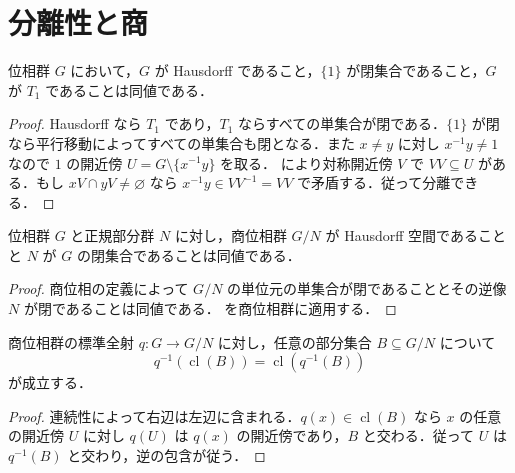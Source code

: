 \section{分離性と商}
\begin{prop}[位相群のHausdorff性の判定]
位相群 $G$ において，$G$ が Hausdorff であること，$\{1\}$ が閉集合であること，$G$ が $T_1$ であることは同値である．
\end{prop}
\begin{proof}
Hausdorff なら $T_1$ であり，$T_1$ ならすべての単集合が閉である．$\{1\}$ が閉なら平行移動によってすべての単集合も閉となる．また $x\ne y$ に対し $x^{-1}y\ne1$ なので $1$ の開近傍 $U=G\setminus\{x^{-1}y\}$ を取る． により対称開近傍 $V$ で $VV\subseteq U$ がある．もし $xV\cap yV\ne\varnothing$ なら $x^{-1}y\in VV^{-1}=VV$ で矛盾する．従って分離できる．
\end{proof}
\begin{prop}[商位相群の分離性]
位相群 $G$ と正規部分群 $N$ に対し，商位相群 $G/N$ が Hausdorff 空間であることと $N$ が $G$ の閉集合であることは同値である．
\end{prop}
\begin{proof}
商位相の定義によって $G/N$ の単位元の単集合が閉であることとその逆像 $N$ が閉であることは同値である． を商位相群に適用する．
\end{proof}
\begin{prop}[閉包と商写像]
商位相群の標準全射 $q:G\to G/N$ に対し，任意の部分集合 $B\subseteq G/N$ について
\[
 q^{-1}(\operatorname{cl}(B))=\operatorname{cl}(q^{-1}(B))
\]
が成立する．
\end{prop}
\begin{proof}
連続性によって右辺は左辺に含まれる．$q(x)\in\operatorname{cl}(B)$ なら $x$ の任意の開近傍 $U$ に対し $q(U)$ は $q(x)$ の開近傍であり，$B$ と交わる．従って $U$ は $q^{-1}(B)$ と交わり，逆の包含が従う．
\end{proof}
